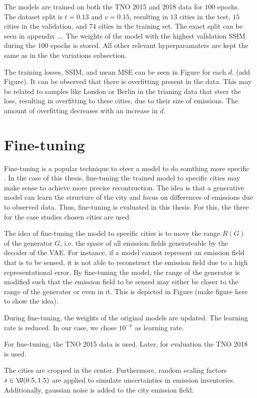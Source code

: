 The models are trained on both the TNO 2015 and 2018 data for $100$ epochs.
The dataset split is $t = 0.13$ and $v = 0.15$, resulting in $13$ cities in the test, $15$ cities in the validation, and $74$ cities in the training set.
The exact split can be seen in appendix \dots.
The weights of the model with the highest validation SSIM during the $100$ epochs is stored.
All other relevant hyperparamaters are kept the same as in the the variations subsection.

The training losses, SSIM, and mean MSE can be seen in Figure for each $d$.
(add Figure).
It can be observed that there is overfitting present in the data.
This may be related to samples like London or Berlin in the trianing data that steer the loss, resulting in overfitting to these cities, due to their size of emissions.
The amount of overfitting decreases with an increase in $d$.


\section{Fine-tuning}
Fine-tuning is a popular technique to steer a model to do somthing more specific \cite{FineTuning}.
In the case of this thesis, fine-tuning the trained model to specific cities may make sense to achieve more precise recontruction.
The idea is that a generative model can learn the structure of the city and focus on differences of emissions due to observed data.
Thus, fine-tuning is evaluated in this thesis.
For this, the three for the case studies chosen cities are used.

The idea of fine-tuning the model to specific cities is to move the range $R(G)$ of the generator $G$, i.e. the space of all emission fields generateable by the decoder of the VAE.
For instance, if a model cannot represent an emission field that is to be sensed, it is not able to reconstruct the emission field due to a high representational error.
By fine-tuning the model, the range of the generator is modified such that the emission field to be sensed may either be closer to the range of the generator or even in it.
This is depicted in Figure (make figure here to show the idea).

During fine-tuning, the weights of the original models are updated.
The learning rate is reduced.
In our case, we chose $10^{-x}$ as learning rate.

For fine-tuning, the TNO 2015 data is used.
Later, for evaluation the TNO 2018 is used.

The cities are cropped in the center.
Furthermore, random scaling factors $s \in \U(0.5, 1.5)$ are applied to simulate uncertainties in emission inventories.
Additionally, gaussian noise is added to the city emission field.

